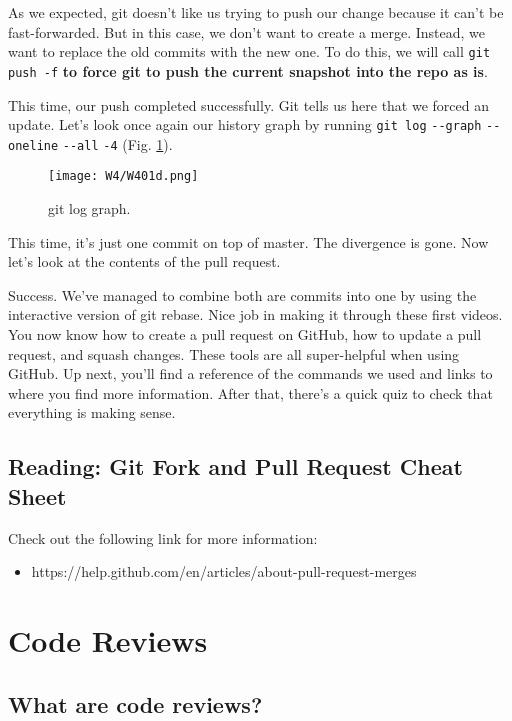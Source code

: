 	As we expected, git doesn't like us trying to push our change because it can't be fast-forwarded. But in this case, we don't want to create a merge. Instead, we want to replace the old commits with the new one. To do this, we will call \verb|git push -f| \textbf{to force git to push the current snapshot into the repo as is}.
	
	This time, our push completed successfully. Git tells us here that we forced an update. Let's look once again our history graph by running \texttt{git log} \verb|--graph| \verb|--oneline| \verb|--all| \verb|-4| (Fig. \ref{W401d}). 
	
	\begin{figure} 
		\caption{git log graph.}
		\centering
		\texttt{[image: W4/W401d.png]}
		\label{W401d}
	\end{figure}
	
	This time, it's just one commit on top of master. The divergence is gone. Now let's look at the contents of the pull request.
	
	Success. We've managed to combine both are commits into one by using the interactive version of git rebase. Nice job in making it through these first videos. You now know how to create a pull request on GitHub, how to update a pull request, and squash changes. These tools are all super-helpful when using GitHub. Up next, you'll find a reference of the commands we used and links to where you find more information. After that, there's a quick quiz to check that everything is making sense.
	
	\subsection{Reading: Git Fork and Pull Request Cheat Sheet}

	Check out the following link for more information:
	\begin{itemize}
		\item https://help.github.com/en/articles/about-pull-request-merges
	\end{itemize}
	

\section{Code Reviews}

	\subsection{What are code reviews?}
	
